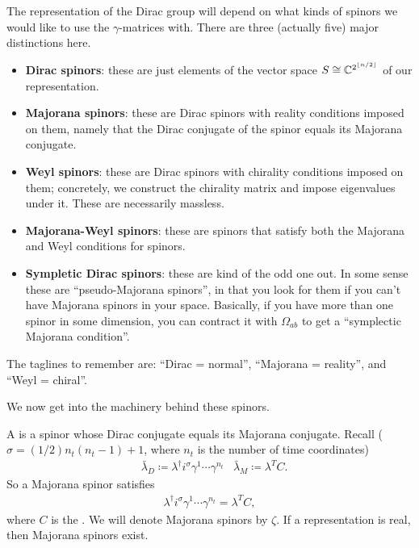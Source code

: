 \documentclass[11pt]{article}
\begin{document}
\begin{iidea}
    The representation of the Dirac group will depend on what kinds
    of spinors we would like to use the $\gamma$-matrices with.
    There are three (actually five) major distinctions here.
    \begin{itemize}
        \item \textbf{Dirac spinors}: these are just elements of
        the vector space $S \cong \mathbb{C}^{2^{\lfloor n/2 \rfloor}}$ of our
        representation.
        \item \textbf{Majorana spinors}: these are Dirac spinors with
        reality conditions imposed on them, namely that the Dirac conjugate
        of the spinor equals its Majorana conjugate.
        \item \textbf{Weyl spinors}: these are Dirac spinors with chirality
        conditions imposed on them; concretely, we construct the chirality
        matrix and impose eigenvalues under it. These are necessarily massless. 
        \item \textbf{Majorana-Weyl spinors}: these are spinors that satisfy
        both the Majorana and Weyl conditions for spinors.
        \item \textbf{Sympletic Dirac spinors}: these are kind of the odd one out.
        In some sense these are ``pseudo-Majorana spinors'', in that you look for them
        if you can't have Majorana spinors in your space. Basically, if you have more 
        than one spinor in some dimension, you can contract it with $\Omega_{ab}$ to get a
        ``symplectic Majorana condition''.
    \end{itemize}
    The taglines to remember are: ``Dirac = normal'', ``Majorana = reality'',
    and ``Weyl = chiral''.
\end{iidea}

\noin
We now get into the machinery behind these spinors.

\begin{definition}
    A  is a spinor whose Dirac conjugate equals its
    Majorana conjugate. Recall ($\sigma = (1/2)n_t (n_t - 1) + 1$, where $n_t$
    is the number of time coordinates)
    \begin{align*}
        & \bar{\lambda}_D \coloneqq \lambda^\dagger i^{\sigma} \gamma^1 \cdots \gamma^{n_t}
        & \bar{\lambda}_M \coloneqq \lambda^T C.
    \end{align*}
    So a Majorana spinor satisfies
    \begin{align*}
        \lambda^\dagger i^\sigma \gamma^1 \cdots \gamma^{n_t} = \lambda^T C,
    \end{align*}
    where $C$ is the . We will
    denote Majorana spinors by $\zeta$. If a representation
    is real, then Majorana spinors exist.
\end{definition}
\end{document}
